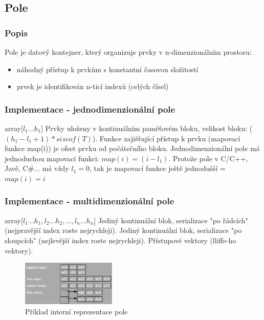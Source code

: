 \documentclass{szzclass}
\begin{document}
\subsection{Pole}
\subsubsection{Popis}
Pole je datový kontejner, který organizuje prvky v n-dimenzionálním prostoru:
\begin{itemize}
    \item náhodný přístup k prvkům s konstantní časovou složitostí
    \item prvek je identifikován n-ticí indexů (celých čísel)
\end{itemize}
\subsubsection{Implementace - jednodimenzionální pole}
array[$l_1 \dots h_1$]
\newline
Prvky uloženy v kontinuálním paměťovém bloku, velikost bloku: ($(h_1 - l_1 + 1) * sizeof(T)$). Funkce zajišťující přístup k prvku (mapovací funkce map(i))
je ofset prvku od počátečního bloku.
\newline
Jednodimenzionální pole má jednoduchou mapovací funkci: $map(i) = (i - l_1)$. Protože pole v C/C++, Javě, C\#... má vždy $ l_1 = 0 $, tak je mapovací
funkce ještě jednodušší = $map(i) = i$
\subsubsection{Implementace - multidimenzionální pole}
array[$l_1 \dots h_1,l_2 \dots h_2,\dots,l_n \dots h_n$]
\newline
Jediný kontinuální blok, serializace "po řádcích" (nejpravější index roste nejrychleji).
Jediný kontinuální blok, serializace "po sloupcích" (nejlevější index roste nejrychleji).
Přístupové vektory (lliffe-ho vektory).
\begin{figure}[h!]
    \centering
    \includegraphics[width=0.4\textwidth]{topics/bi-spol-22/images/multidimensionalArray.png}
    \caption{Příklad interní reprezentace pole}
\end{figure}
\end{document}
